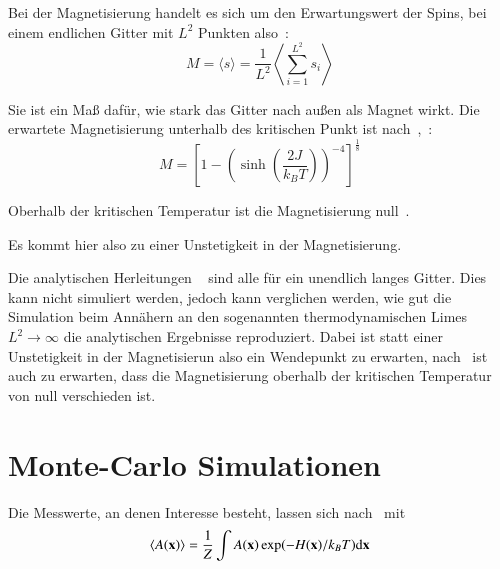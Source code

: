 	
	Bei der Magnetisierung handelt es sich um den Erwartungswert der Spins, bei einem endlichen Gitter mit $L^2$ Punkten also~\cite[vgl. ][S. 8]{binderheermann}:
	\begin{equation}
	M=\langle s \rangle=\frac{1}{L^2}\left\langle  \sum_{i=1}^{L^2} s_i \right\rangle
	\label{eq:magnetisierung}
	\end{equation}

	
	Sie ist ein Maß dafür, wie stark das Gitter nach außen als Magnet wirkt. Die erwartete Magnetisierung unterhalb des kritischen Punkt ist nach~\cite{YangMagnetization},~\cite{MontrollMagnetization}:
	\begin{equation} M=\left[1-\left(\sinh\left(\frac{2J}{k_BT}\right)\right)^{-4}\right]^{\frac{1}{8}}
	\label{eq:magnetisierungsgleichungliteratur}
	\end{equation}
	
	Oberhalb der kritischen Temperatur ist die Magnetisierung null~\cite[Gl. 81]{MontrollMagnetization}.
	
	Es kommt hier also zu einer Unstetigkeit in der Magnetisierung.
	
	Die analytischen Herleitungen ~\cite{OnsagerCrystal1,YangMagnetization,MontrollMagnetization} sind alle für ein unendlich langes Gitter. Dies kann nicht simuliert werden, jedoch kann verglichen werden, wie gut die Simulation beim Annähern an den sogenannten thermodynamischen Limes $L^2\to\infty$ die analytischen Ergebnisse reproduziert.
	Dabei ist statt einer Unstetigkeit in der Magnetisierun also ein Wendepunkt zu erwarten, nach~\cite[S. 45ff., S.101f.]{binderheermann} ist auch zu erwarten, dass die Magnetisierung oberhalb der kritischen Temperatur von null verschieden ist.%
	
	
	\section{Monte-Carlo Simulationen}
	\label{sec:mctheorie}
	Die Messwerte, an denen Interesse besteht, lassen sich nach~\cite[S. 8]{binderheermann}  mit \[
	\langle A(\mathbf{x}) \rangle=\frac{1}{Z}\int A(\mathbf{x}) \exp(-H(\mathbf{x})/k_BT)\text{d} \mathbf{x}\]
	
